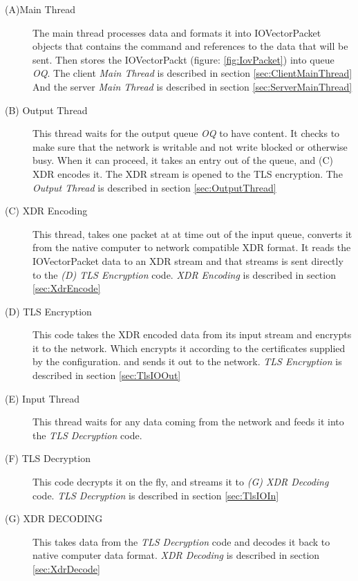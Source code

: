 \begin{description}
\item[(A)Main Thread]\label{item:MainThread}
	The main thread processes data and formats it into
  IOVectorPacket objects that contains the command
  and references to the data that will be sent.
  Then stores the IOVectorPackt (figure: \ref{fig:IovPacket})
  into queue \textit{OQ}.
  The client \textit{Main Thread} is described in section \ref{sec:ClientMainThread}
  And the server \textit{Main Thread} is described in section \ref{sec:ServerMainThread}

\item[(B) Output Thread]
  This thread waits for the output queue \textit{OQ} to have
  content.
  It checks to make sure that the network is writable and not write blocked
  or otherwise busy.
  When it can proceed, it takes an entry out of the queue,
  and (C) XDR encodes it.
  The XDR stream is opened to the TLS encryption.
  The \textit{Output Thread} is described in section \ref{sec:OutputThread}
  
\item[(C) XDR Encoding]\label{item:XdrEncodingThread}
	This thread, takes one packet at at time
	out of the input queue,	converts it from the native computer
  to network compatible XDR format.
  It reads the IOVectorPacket data to an XDR stream and that streams is sent directly
  to the \textit{(D) TLS Encryption} code.
  \textit{XDR Encoding} is described in section \ref{sec:XdrEncode}

\item[(D) TLS Encryption]\label{item:TlsEncryption}
  This code takes the XDR encoded data from its input stream
  and encrypts it to the network.
  Which encrypts it according to the certificates supplied by the configuration.
  and sends it out to the network.
  \textit{TLS Encryption} is described in section \ref{sec:TlsIOOut}

\item[(E) Input Thread]\label{item:InputThread}
  This thread waits for any data coming from the network
  and feeds it into the \textit{TLS Decryption} code.
    
\item[(F) TLS Decryption]\label{item:TlsDecryptionThread}
  This code decrypts it on the fly, and streams it to \textit{(G) XDR Decoding} code.
  \textit{TLS Decryption} is described in section \ref{sec:TlsIOIn}

\item[(G) XDR DECODING]\label{item:XdrDecoding}
  This takes data from the \textit{TLS Decryption} code and decodes
  it back to native computer data format.
  \textit{XDR Decoding} is described in section \ref{sec:XdrDecode}
  

\end{description}
